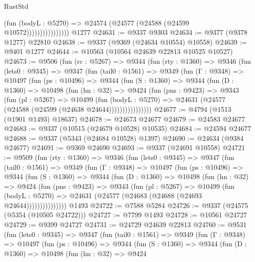\begin{lexlean}{RustStd}
\begin{coremodule}
                            (fun (bodyL : @5270) =>
                            @24574 (@24577 (@24588 (@24599 @10572))))))))))))))))
    @1277
@24631 := @9337 @9303
@24634 := @9377 (@9378 @1277) @22810
@24638 := @9337 (@9369 (@24634 @10554) @10558)
@24639 := @9401 @1277
@24644 := @10563 (@10564 @24639 @22813 @10525 @10527)
@24673 := @9506
    (fun (rc : @5267) =>
    @9344
      (fun (rty : @1360) =>
      @9346
        (fun (lets0 : @9345) =>
        @9347
          (fun (tail0 : @1561) =>
          @9349
            (fun (Γ : @9348) =>
            @10497
              (fun (ps : @10496) =>
              @9344
                (fun (S : @1360) =>
                @9344
                  (fun (D : @1360) =>
                  @10498
                    (fun (hn : @32) =>
                    @9424
                      (fun (pns : @9423) =>
                      @9343
                        (fun (pl : @5267) =>
                        @10499
                          (fun (bodyL : @5270) =>
                          @24631 (@24577 (@24588 (@24599 (@24638 @24644))))))))))))))))
@24677 := @4794 (@1513 (@1901 @1493) @18637)
@24678 := @24673 @24677
@24679 := @24583 @24677
@24683 := @9337 (@10515 (@24679 @10528) @10535)
@24684 := @24594 @24677
@24688 := @9337 (@5343 (@24684 @10528) @1397)
@24690 := @24634 (@9384 @24677)
@24691 := @9369 @24690
@24693 := @9337 (@24691 @10558)
@24721 := @9509
    (fun (rty : @1360) =>
    @9346
      (fun (lets0 : @9345) =>
      @9347
        (fun (tail0 : @1561) =>
        @9349
          (fun (Γ : @9348) =>
          @10497
            (fun (ps : @10496) =>
            @9344
              (fun (S : @1360) =>
              @9344
                (fun (D : @1360) =>
                @10498
                  (fun (hn : @32) =>
                  @9424
                    (fun (pns : @9423) =>
                    @9343
                      (fun (pl : @5267) =>
                      @10499
                        (fun (bodyL : @5270) =>
                        @24631 (@24577 (@24683 (@24688 (@24693 @24644)))))))))))))))
    @1493
@24722 := @7588 @5284
@24726 := @9337 (@24575 (@5354 (@10505 @24722)))
@24727 := @7799 @1493
@24728 := @10561 @24727
@24729 := @9399 @24727
@24731 := @24729 @24639 @22813
@24760 := @9531
    (fun (lets0 : @9345) =>
    @9347
      (fun (tail0 : @1561) =>
      @9349
        (fun (Γ : @9348) =>
        @10497
          (fun (ps : @10496) =>
          @9344
            (fun (S : @1360) =>
            @9344
              (fun (D : @1360) =>
              @10498
                (fun (hn : @32) =>
                @9424

\end{coremodule}
\end{lexlean}
